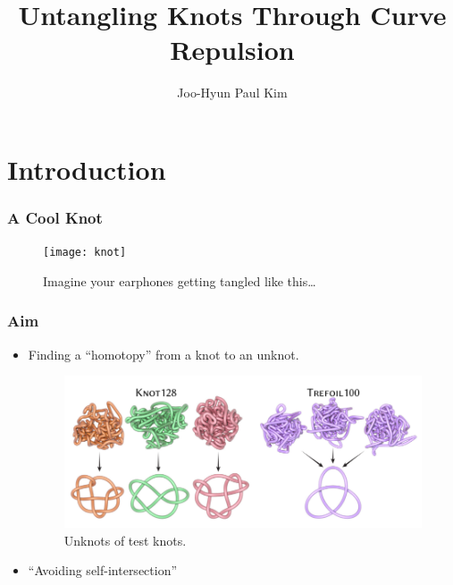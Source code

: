 \documentclass{beamer}
\title{Untangling Knots Through Curve Repulsion}
\author{Joo-Hyun Paul Kim}
\theoremstyle{remark}
\begin{document}
\begin{frame}
    \titlepage
\end{frame}


\section{Introduction}
\begin{frame}
    \frametitle{A Cool Knot}
    \begin{figure}[h]
        \centering
        \texttt{[image: knot]}
        \caption{Imagine your earphones getting tangled like this\ldots}
    \end{figure}
\end{frame}


\begin{frame}
    \frametitle{Aim}
    \begin{itemize}
        \item<1-> Finding a ``homotopy'' from a knot to an unknot.
            \begin{figure}[h]
                \centering
                \includegraphics[scale=0.2]{knotsolving}
                \caption{Unknots of test knots.\cite{YSC2021}}
            \end{figure}
        \item<2-> ``Avoiding self-intersection''
    \end{itemize}
\end{frame}
\end{document}
